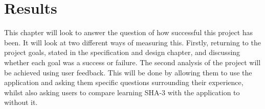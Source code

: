 \chapter{Results}
This chapter will look to answer the question of how successful this project has been. It will look at two different ways of measuring this. Firstly, returning to the project goals, stated in the specification and design chapter, and discussing whether each goal was a success or failure. The second analysis of the project will be achieved using user feedback. This will be done by allowing them to use the application and asking them specific questions surrounding their experience, whilst also asking users to compare learning SHA-3 with the application to without it.